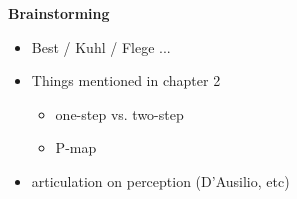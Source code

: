 \textbf{Brainstorming} \\

\begin{itemize}
\item Best / Kuhl / Flege ...
\item Things mentioned in chapter 2
  \begin{itemize}
  \item one-step vs. two-step
  \item P-map
  \end{itemize}
\item articulation on perception (D'Ausilio, etc)
\end{itemize}

